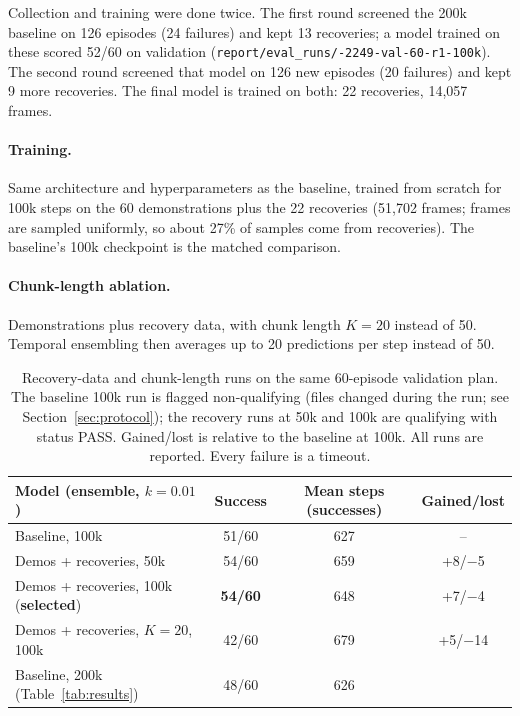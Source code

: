 \documentclass[11pt,a4paper]{article}
\begin{document}
Collection and training were done twice. The first round screened the 200k
baseline on 126 episodes (24 failures) and kept 13 recoveries; a model
trained on these scored 52/60 on validation
(\texttt{report/\allowbreak eval\_runs/-2249-val-60-r1-100k}).
The second round screened that model on 126 new episodes (20 failures) and
kept 9 more recoveries. The final model is trained on both: 22 recoveries,
14{,}057 frames.

\paragraph{Training.} Same architecture and hyperparameters as the
baseline, trained from scratch for 100k steps on the 60 demonstrations plus
the 22 recoveries (51{,}702 frames; frames are sampled uniformly, so about
27\% of samples come from recoveries). The baseline's 100k checkpoint is the
matched comparison.

\paragraph{Chunk-length ablation.} Demonstrations plus recovery data, with
chunk length $K=20$ instead of 50. Temporal ensembling then averages up to
20 predictions per step instead of 50.

\begin{table}[h]
\centering
\begin{tabular}{lccc}
\toprule
Model (ensemble, $k=0.01$) & Success & Mean steps (successes) & Gained/lost \\
\midrule
Baseline, 100k & 51/60 & 627 & -- \\
Demos + recoveries, 50k & 54/60 & 659 & +8/$-$5 \\
Demos + recoveries, 100k (\textbf{selected}) & \textbf{54/60} & 648 & +7/$-$4 \\
Demos + recoveries, $K=20$, 100k & 42/60 & 679 & +5/$-$14 \\
\midrule
Baseline, 200k (Table~\ref{tab:results}) & 48/60 & 626 & \\
\bottomrule
\end{tabular}
\caption{Recovery-data and chunk-length runs on the same 60-episode
validation plan. The baseline 100k run is flagged non-qualifying (files
changed during the run; see Section~\ref{sec:protocol}); the recovery runs
at 50k and 100k are qualifying with status PASS. Gained/lost is relative to
the baseline at 100k. All runs are reported. Every failure is a timeout.}
\label{tab:recovery}
\end{table}
\end{document}
